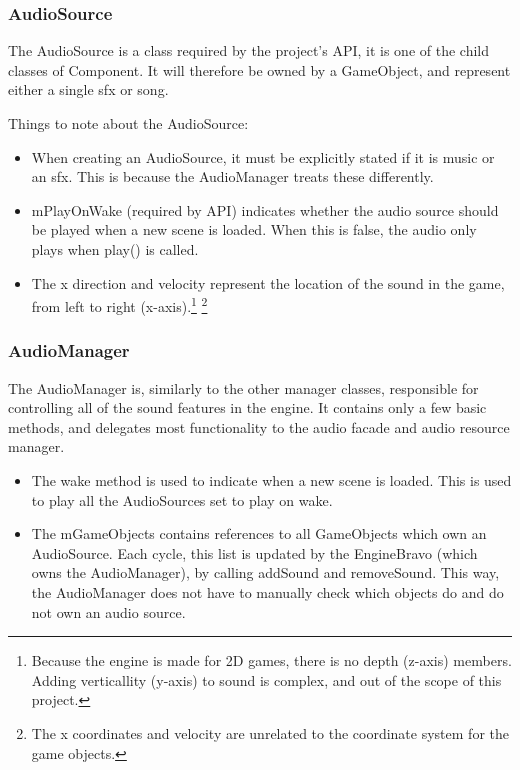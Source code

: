 \documentclass[draft]{article}
\begin{document}
\subsubsection{AudioSource}
The AudioSource is a class required by the project's API, it is one of the child classes of Component.
It will therefore be owned by a GameObject, and represent either a single sfx or song.

Things to note about the AudioSource:
\begin{itemize}
  \item When creating an AudioSource, it must be explicitly stated if it is music or an sfx. This is because the AudioManager treats these differently.
  \item mPlayOnWake (required by API) indicates whether the audio source should be played when a new scene is loaded. When this is false, the audio only plays when play() is called.
  \item The x direction and velocity represent the location of the sound in the game, from left to right (x-axis).\footnote{Because the engine is made for 2D games, there is no depth (z-axis) members. Adding verticallity (y-axis) to sound is complex, and out of the scope of this project.} \footnote{The x coordinates and velocity are unrelated to the coordinate system for the game objects.}
\end{itemize}

\subsubsection{AudioManager}
The AudioManager is, similarly to the other manager classes, responsible for controlling all of the sound features in the engine.
It contains only a few basic methods, and delegates most functionality to the audio facade and audio resource manager.

\begin{itemize}
  \item The wake method is used to indicate when a new scene is loaded. This is used to play all the AudioSources set to play on wake.
  \item The mGameObjects contains references to all GameObjects which own an AudioSource. Each cycle, this list is updated by the EngineBravo (which owns the AudioManager), by calling addSound and removeSound. This way, the AudioManager does not have to manually check which objects do and do not own an audio source.
\end{itemize}
\end{document}
